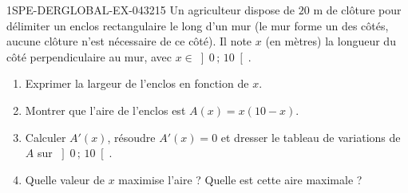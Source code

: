 \begin{exercice}{1SPE-DERGLOBAL-EX-043}{2}{15}
Un agriculteur dispose de $20$ m de clôture pour délimiter un enclos rectangulaire
le long d'un mur (le mur forme un des côtés, aucune clôture n'est nécessaire de ce côté).
Il note $x$ (en mètres) la longueur du côté perpendiculaire au mur, avec $x \in \left]0\,;\,10\right[$.

\begin{enumerate}
  \item Exprimer la largeur de l'enclos en fonction de $x$.
  \item Montrer que l'aire de l'enclos est $A(x) = x(10 - x)$.
  \item Calculer $A'(x)$, résoudre $A'(x) = 0$ et dresser le tableau de variations de $A$ sur $\left]0\,;\,10\right[$.
  \item Quelle valeur de $x$ maximise l'aire ? Quelle est cette aire maximale ?
\end{enumerate}
\end{exercice}
